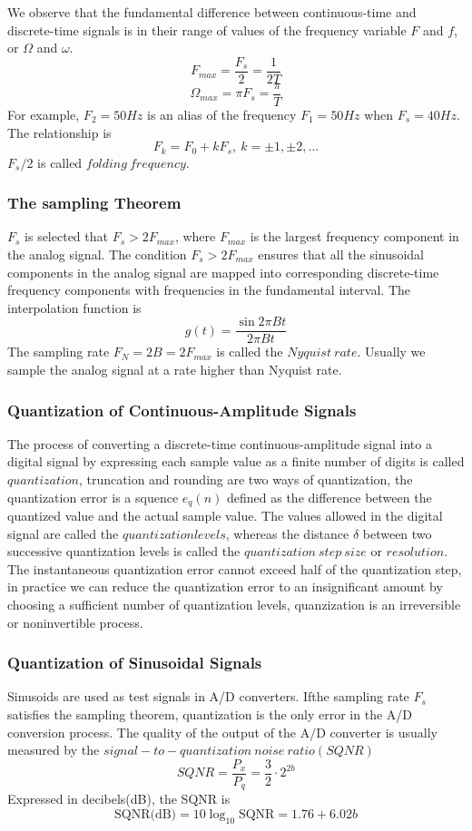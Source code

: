 \documentclass[10pt,a4paper,oneside]{article}
\begin{document}
We observe that the fundamental difference between continuous-time and discrete-time signals is in their range of values of the frequency variable $F$ and $f$, or $\Omega$ and $\omega$.
\[
F_{max}=\frac{F_s}{2}=\frac{1}{2T}
\]
\[
\Omega_{max} = \pi F_s = \frac{\pi}{T}
\]
For example, $F_2=50Hz$ is an alias of the frequency $F_1=50Hz$ when $F_s=40Hz$. The relationship is
\[
F_k = F_0+kF_s,\ k=\pm1,\pm2,...
\]
$F_s/2$ is called $folding\ frequency$.
\subsubsection{The sampling Theorem}
$F_s$ is selected that $F_s>2F_{max}$, where $F_{max}$ is the largest frequency component in the analog signal. The condition $F_s>2F_{max}$ ensures that all the sinusoidal components in the analog signal are mapped into corresponding discrete-time frequency components with frequencies in the fundamental interval. The interpolation function is
\[
g(t) = \frac{\sin 2\pi Bt}{2\pi Bt}
\]
The sampling rate $F_N=2B=2F_{max}$ is called the $Nyquist\ rate$. Usually we sample the analog signal at a rate higher than Nyquist rate.
\subsubsection{Quantization of Continuous-Amplitude Signals}
The process of converting a discrete-time continuous-amplitude signal into a digital signal by expressing each sample value as a finite number of digits is called $quantization$, truncation and rounding are two ways of quantization, the quantization error is a squence $e_q(n)$ defined as the difference between the quantized value and the actual sample value. The values allowed in the digital signal are called the $quantization levels$, whereas the distance $\delta$ between two successive quantization levels is called the $quantization\ step\ size$ or $resolution$.
The instantaneous quantization error cannot exceed half of the quantization step, in practice we can reduce the quantization error to an insignificant amount by choosing a sufficient number of quantization levels, quanzization is an irreversible or noninvertible process.
\subsubsection{Quantization of Sinusoidal Signals}
Sinusoids are used as test signals in A/D converters. Ifthe sampling rate $F_s$ satisfies the sampling theorem, quantization is the only error in the A/D conversion process. The quality of the output of the A/D converter is usually measured by the $signal-to-quantization\ noise\ ratio(SQNR)$
\[
SQNR=\frac{P_x}{P_q}=\frac{3}{2}\cdot2^{2b}
\]
Expressed in decibels(dB), the SQNR is
\[
\text{SQNR(dB)} = 10\log_{10}\text{SQNR}=1.76+6.02b
\]
\end{document}
